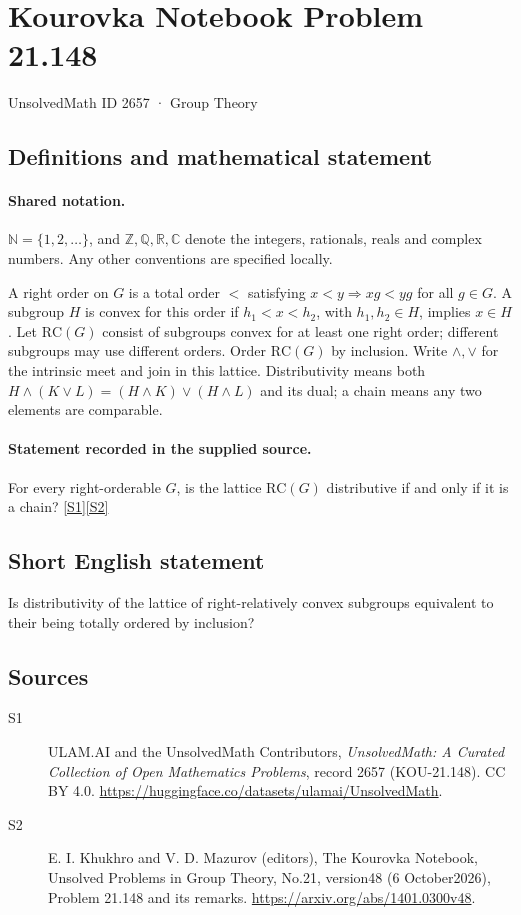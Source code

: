 \documentclass[11pt]{article}
\newcommand{\sref}[2]{\hyperlink{source:#1:#2}{[S#2]}}
\begin{document}
\setcounter{section}{2656}
\section{Kourovka Notebook Problem 21.148}\label{2657}
{\small\sffamily UnsolvedMath ID 2657 · Group Theory}
\subsection{Definitions and mathematical statement}

\paragraph{Shared notation.}$\mathbb N=\{1,2,\ldots\}$, and $\mathbb Z,\mathbb Q,\mathbb R,\mathbb C$ denote the integers, rationals, reals and complex numbers. Any other conventions are specified locally.


A right order on $G$ is a total order $<$ satisfying $x<y\Rightarrow xg<yg$ for all $g\in G$. A subgroup $H$ is convex for this order if $h_1<x<h_2$, with $h_1,h_2\in H$, implies $x\in H$. Let $\mathrm{RC}(G)$ consist of subgroups convex for at least one right order; different subgroups may use different orders. Order $\mathrm{RC}(G)$ by inclusion. Write $\wedge,\vee$ for the intrinsic meet and join in this lattice. Distributivity means both $H\wedge(K\vee L)=(H\wedge K)\vee(H\wedge L)$ and its dual; a chain means any two elements are comparable.
\paragraph{Statement recorded in the supplied source.}
For every right-orderable $G$, is the lattice $\mathrm{RC}(G)$ distributive if and only if it is a chain? \sref{2657}{1}\sref{2657}{2}
\subsection{Short English statement}
Is distributivity of the lattice of right-relatively convex subgroups equivalent to their being totally ordered by inclusion?
\subsection{Sources}
\begin{description}
\item[\hypertarget{source:2657:1}{S1}] ULAM.AI and the UnsolvedMath Contributors, \emph{UnsolvedMath: A Curated Collection of Open Mathematics Problems}, record 2657 (KOU-21.148). CC BY 4.0. \url{https://huggingface.co/datasets/ulamai/UnsolvedMath}.
\item[\hypertarget{source:2657:2}{S2}] E. I. Khukhro and V. D. Mazurov (editors), The Kourovka Notebook, Unsolved Problems in Group Theory, No.21, version48 (6 October2026), Problem 21.148 and its remarks. \url{https://arxiv.org/abs/1401.0300v48}.
\end{description}
\label{end:2657}
\end{document}
